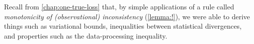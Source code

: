 %
Recall from \cref{chap:one-true-loss} that, by simple applications of a rule called \emph{monotonicity of (observational) inconsistency} (\cref{lemma:!}), we were able to derive things such as variational bounds, inequalities between statistical divergences, and properties such as the data-processing inequality. 
